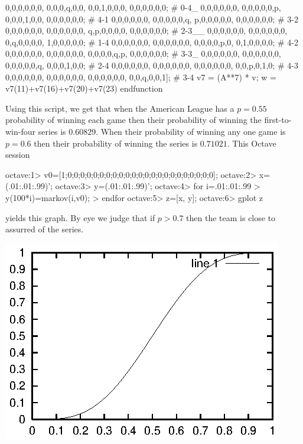 \begin{ans}{6}
\begin{exparts}
\begin{computercode}
     0,0,0,0,0,0, 0,0,0,q,0,0, 0,0,1,0,0,0, 0,0,0,0,0,0;  # 0-4_
     0,0,0,0,0,0, 0,0,0,0,0,p, 0,0,0,1,0,0, 0,0,0,0,0,0;  # 4-1
     0,0,0,0,0,0, 0,0,0,0,0,q, p,0,0,0,0,0, 0,0,0,0,0,0;  # 3-2
     0,0,0,0,0,0, 0,0,0,0,0,0, q,p,0,0,0,0, 0,0,0,0,0,0;  # 2-3__
     0,0,0,0,0,0, 0,0,0,0,0,0, 0,q,0,0,0,0, 1,0,0,0,0,0;  # 1-4
     0,0,0,0,0,0, 0,0,0,0,0,0, 0,0,0,0,p,0, 0,1,0,0,0,0;  # 4-2
     0,0,0,0,0,0, 0,0,0,0,0,0, 0,0,0,0,q,p, 0,0,0,0,0,0;  # 3-3_
     0,0,0,0,0,0, 0,0,0,0,0,0, 0,0,0,0,0,q, 0,0,0,1,0,0;  # 2-4
     0,0,0,0,0,0, 0,0,0,0,0,0, 0,0,0,0,0,0, 0,0,p,0,1,0;  # 4-3
     0,0,0,0,0,0, 0,0,0,0,0,0, 0,0,0,0,0,0, 0,0,q,0,0,1]; # 3-4
  v7 = (A**7) * v;
  w = v7(11)+v7(16)+v7(20)+v7(23)
endfunction
\end{computercode}
       Using this script, we get that when the American League has a
       $p=0.55$ probability of winning each game then their probability
       of winning the first-to-win-four series is $0.60829$.
       When their probability of winning any one game is $p=0.6$
       then their probability of winning the series is
       $0.71021$.
      \partsitem This Octave session
\begin{computercode}
octave:1> v0=[1;0;0;0;0;0;0;0;0;0;0;0;0;0;0;0;0;0;0;0;0;0;0;0];
octave:2> x=(.01:.01:.99)';
octave:3> y=(.01:.01:.99)';
octave:4> for i=.01:.01:.99
>          y(100*i)=markov(i,v0);
>         endfor
octave:5> z=[x, y];
octave:6> gplot z
\end{computercode}
       yields this graph.
       By eye we judge that if $p>0.7$ then the team is close to assurred
       of the series.
       \begin{center}
         \includegraphics{ws.eps}
       \end{center}
     \end{exparts}
    
\end{ans}
